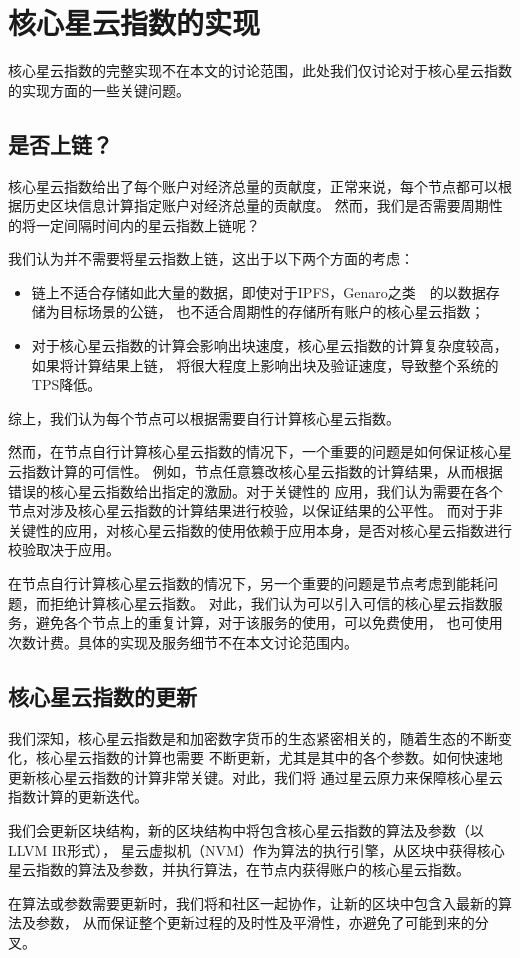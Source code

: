\section{核心星云指数的实现}
核心星云指数的完整实现不在本文的讨论范围，此处我们仅讨论对于核心星云指数的实现方面的一些关键问题。

\subsection{是否上链？\label{sec:onchain?}}
核心星云指数给出了每个账户对经济总量的贡献度，正常来说，每个节点都可以根据历史区块信息计算指定账户对经济总量的贡献度。
然而，我们是否需要周期性的将一定间隔时间内的星云指数上链呢？

我们认为并不需要将星云指数上链，这出于以下两个方面的考虑：
\begin{itemize}
\item 链上不适合存储如此大量的数据，即使对于IPFS，Genaro之类~\cite{IPFS}~\cite{Genaro}的以数据存储为目标场景的公链，
也不适合周期性的存储所有账户的核心星云指数；
\item 对于核心星云指数的计算会影响出块速度，核心星云指数的计算复杂度较高，如果将计算结果上链，
将很大程度上影响出块及验证速度，导致整个系统的TPS降低。
\end{itemize}
\noindent 综上，我们认为每个节点可以根据需要自行计算核心星云指数。

然而，在节点自行计算核心星云指数的情况下，一个重要的问题是如何保证核心星云指数计算的可信性。
例如，节点任意篡改核心星云指数的计算结果，从而根据错误的核心星云指数给出指定的激励。对于关键性的
应用，我们认为需要在各个节点对涉及核心星云指数的计算结果进行校验，以保证结果的公平性。
而对于非关键性的应用，对核心星云指数的使用依赖于应用本身，是否对核心星云指数进行校验取决于应用。

在节点自行计算核心星云指数的情况下，另一个重要的问题是节点考虑到能耗问题，而拒绝计算核心星云指数。
对此，我们认为可以引入可信的核心星云指数服务，避免各个节点上的重复计算，对于该服务的使用，可以免费使用，
也可使用次数计费。具体的实现及服务细节不在本文讨论范围内。

\subsection{核心星云指数的更新}
我们深知，核心星云指数是和加密数字货币的生态紧密相关的，随着生态的不断变化，核心星云指数的计算也需要
不断更新，尤其是其中的各个参数。如何快速地更新核心星云指数的计算非常关键。对此，我们将
通过星云原力来保障核心星云指数计算的更新迭代。

我们会更新区块结构，新的区块结构中将包含核心星云指数的算法及参数（以LLVM IR形式），
星云虚拟机（NVM）作为算法的执行引擎，从区块中获得核心星云指数的算法及参数，并执行算法，在节点内获得账户的核心星云指数。

在算法或参数需要更新时，我们将和社区一起协作，让新的区块中包含入最新的算法及参数，
从而保证整个更新过程的及时性及平滑性，亦避免了可能到来的分叉。


%
